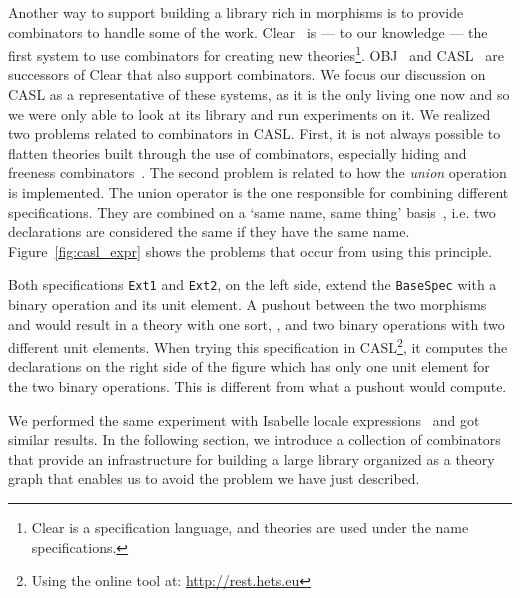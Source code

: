 Another way to support building a library rich in morphisms is to provide combinators to handle some of the work. Clear~\cite{Goguen1980} is --- to our knowledge --- the first system to use combinators for creating new theories\footnote{Clear is a specification language, and theories are used under the name specifications.}. OBJ~\cite{Obj2000Goguen} and CASL~\cite{CoFI:2004:CASL-RM} are successors of Clear that also support combinators. We focus our discussion on CASL as a representative of these systems, as it is the only living one now and so we were only able to look at its library and run experiments on it. 
We realized two problems related to combinators in CASL. First, it is not always possible to flatten theories built through the use of combinators, especially hiding and freeness combinators~\cite{CoFI:2004:CASL-RM}. The second problem is related to how the \emph{union} operation is implemented. The union operator is the one responsible for combining different specifications. They are combined on a `same name, same thing' basis~\cite{bidoit2003casl}, i.e. two declarations are considered the same if they have the same name. Figure~\ref{fig:casl_expr} shows the problems that occur from using this principle. 
\begin{figure}

\end{figure}
Both specifications \verb|Ext1| and \verb|Ext2|, on the left side, extend the \verb|BaseSpec| with a binary operation and its unit element. %
A pushout between the two morphisms  and  would result in a theory with one sort, , and  two binary operations with two different unit elements. When trying this specification in CASL\footnote{Using the online tool at: \url{http://rest.hets.eu}}, it computes the declarations on the right side of the figure which has only one unit element for the two binary operations. This is different from what a pushout would compute. 

We performed the same experiment with Isabelle locale expressions~\cite{ballarin2003locales} and got similar results. In the following section, we introduce a collection of combinators that provide an infrastructure for building a large library organized as a theory graph that enables us to avoid the problem we have just described. 


